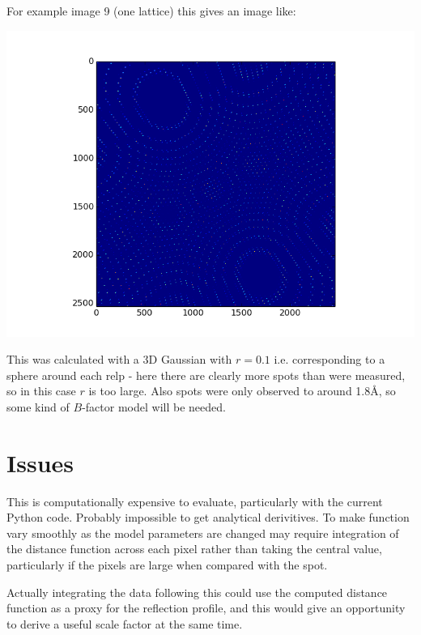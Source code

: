 \documentclass[a4paper, 11pt]{article}
\begin{document}
For example image 9 (one lattice) this gives an image like:

\includegraphics[scale=0.5]{project_x.png}

This was calculated with a 3D Gaussian with $r=0.1$ i.e. corresponding to a 
sphere around each relp - here there are clearly more spots than were measured,
so in this case $r$ is too large. Also spots were only observed to around 
1.8\AA, so some kind of $B$-factor model will be needed.

\section{Issues}

This is computationally expensive to evaluate, particularly with the current 
Python code. Probably impossible to get analytical derivitives. To make function
vary smoothly as the model parameters are changed may require integration of 
the distance function across each pixel rather than taking the central value, 
particularly if the pixels are large when compared with the spot. 

Actually integrating the data following this could use the computed distance 
function as a proxy for the reflection profile, and this would give an 
opportunity to derive a useful scale factor at the same time.
\end{document}
